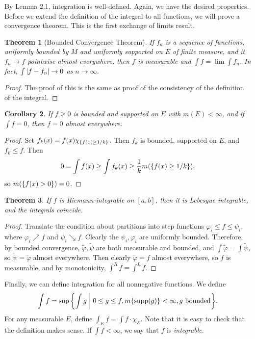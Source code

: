 \documentclass[leqno, openany]{memoir}
\newtheorem{thm}{Theorem}[chapter]
\newtheorem{cor}[thm]{Corollary}
\theoremstyle{definition}
\theoremstyle{remark}
\theoremstyle{plain}
\theoremstyle{definition}
\theoremstyle{remark}
\newcommand{\wt}[1]{\widetilde{#1}}
\DeclareMathOperator{\supp}{supp}
\begin{document}
By Lemma 2.1, integration is well-defined. Again, we have the desired
properties. Before we extend the definition of the integral to all functions,
we will prove a convergence theorem. This is the first exchange of limits
result.

\begin{thm}[Bounded Convergence Theorem] If $f_n$ is a sequence of functions,
    uniformly bounded by $M$ and uniformly supported on $E$ of finite measure,
    and it $f_n \to f$ pointwise almost everywhere, then $f$ is measurable and
    $\int f = \lim \int f_n$. In fact, $\int \abs{f - f_n} \to 0$ as $n \to
    \infty$.  \end{thm}

\begin{proof} The proof of this is the same as proof of the consistency of the
definition of the integral.  \end{proof}

\begin{cor} If $f \geq 0$ is bounded and supported on $E$ with $m(E) < \infty$,
and if $\int f = 0$, then $f = 0$ almost everywhere.  \end{cor}

\begin{proof} Set $f_k(x) = f(x) \chi_{\qty{f(x) \geq 1/k}}$. Then $f_k$ is
    bounded, supported on $E$, and $f_k \leq f$. Then \[ 0 = \int f(x) \geq
    \int f_k(x) \geq \frac{1}{k} m\qty(\qty{f(x) \geq 1/k}), \] so
    $m\qty(\qty{f(x) > 0}) = 0$.  \end{proof}

\begin{thm} If $f$ is Riemann-integrable on $[a,b]$, then it is Lebesgue
integrable, and the integrals coincide.  \end{thm}

\begin{proof} Translate the condition about partitions into step functions
    $\varphi_i \leq f \leq \psi_i$, where $\varphi_i \nearrow f$ and $\psi_i
    \searrow f$. Clearly the $\psi_i, \varphi_i$ are uniformly bounded.
    Therefore, by bounded convergence, $\wt{\varphi}, \wt{\psi}$ are both
    measurable and bounded, and $\int \wt{\varphi} = \int \wt{\psi}$, so
    $\wt{\psi} = \wt{\varphi}$ almost everywhere. Then clearly $\wt{\varphi} =
    f$ almost everywhere, so $f$ is measurable, and by monotonicity, $\int^R f
    = \int^L f$.  \end{proof}

Finally, we can define integration for all nonnegative functions. We define \[
\int f = \sup \qty{\int g \mathrel{\bigg|} 0 \leq g \leq f, m\qty{\supp(g)}<
\infty, g \text{ bounded}}. \] For any measurable $E$, define $\int_E f = \int
f \cdot \chi_E$. Note that it is easy to check that the definition makes sense.
If $\int f < \infty$, we say that $f$ is \textit{integrable}.
\end{document}
